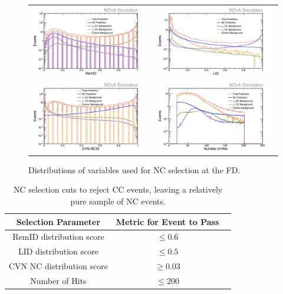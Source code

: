 \begin{figure}[h]
  \centering
  \begin{tabular}{c c}
    \includegraphics[width=.48\textwidth]{figures/NP1RmID.png} &
    \includegraphics[width=.48\textwidth]{figures/NP1ELID.png} \\
    \includegraphics[width=.48\textwidth]{figures/NP1CVNC.png} &
    \includegraphics[width=.48\textwidth]{figures/NP1NHit.png} \\
  \end{tabular}
  \caption[NC Selection Variable Distributions]{Distributions of variables used for NC selection at the FD.}
  \label{fig:NCSel}
\end{figure}

\begin{table}[h]
  \begin{center}
    \caption[NC Selection Cuts]{NC selection cuts to reject CC events, leaving a relatively pure sample of NC events.}
    \label{tab:NCSel}
    \begin{tabular}{c c c}
      \hline\hline
      Selection Parameter & Metric for Event to Pass \\
      \hline
      RemID distribution score & $\leq 0.6$ \\
      LID distribution score & $\leq 0.5$ \\
      CVN NC distribution score & $\geq 0.03$ \\
      Number of Hits & $\leq 200$ \\
      \hline
    \end{tabular}
  \end{center}
\end{table}

